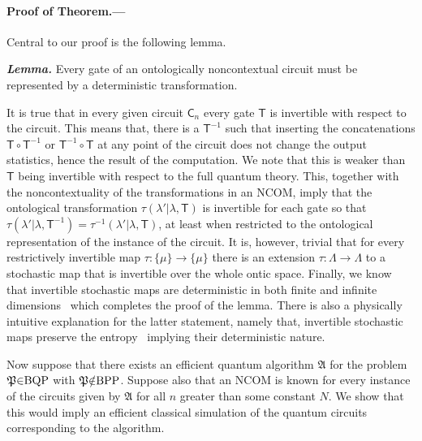 \documentclass[prl,twocolumn,amsmath,amssymb,nofootinbib]{revtex4-1}
\newcommand{\TT}{\mathsf{T}}
\newcommand{\cc}{\mathsf{C}}
\newcommand{\prob}{\mathfrak{P}}
\newcommand{\alg}{\mathfrak{A}}
\begin{document}
%
\paragraph*{Proof of Theorem.---}

Central to our proof is the following lemma.

%
\textit{\textbf{Lemma.}}
Every gate of an ontologically noncontextual circuit must be represented by a deterministic transformation.
%


It is true that in every given circuit $\cc_n$ every gate $\TT$ is invertible with respect to the circuit.
This means that, there is a $\TT^{-1}$ such that inserting the concatenations $\TT{\circ}\TT^{-1}$ or $\TT^{-1}{\circ}\TT$ at any point of the circuit does not change the output statistics, hence the result of the computation.
We note that this is weaker than $\TT$ being invertible with respect to the full quantum theory.
This, together with the noncontextuality of the transformations in an NCOM, imply that the ontological transformation $\tau(\lambda'|\lambda,\TT)$ is invertible for each gate so that $\tau(\lambda'|\lambda,\TT^{-1}) {=} \tau^{-1}(\lambda'|\lambda,\TT)$, at least when restricted to the ontological representation of the instance of the circuit.
It is, however, trivial that for every restrictively invertible map $\tau {:} \{\mu\} {\to} \{\mu\}$ there is an extension $\tau {:} \Lambda {\to} \Lambda$ to a stochastic map that is invertible over the whole ontic space.
Finally, we know that invertible stochastic maps are deterministic in both finite and infinite dimensions~\cite{Farahat1966,Schwarz1967,Attal2010} which completes the proof of the lemma.
There is also a physically intuitive explanation for the latter statement, namely that, invertible stochastic maps preserve the entropy~\cite{Mackey1992} implying their deterministic nature.

Now suppose that there exists an efficient quantum algorithm $\mathfrak{A}$ for the problem $\prob{\in}\rm BQP$ with $\prob {\notin} \rm BPP$. 
Suppose also that an NCOM is known for every instance of the circuits given by $\alg$ for all 
$n$ greater than some constant $N$.
We show that this would imply an efficient classical simulation of the quantum circuits corresponding to the algorithm.
\end{document}
